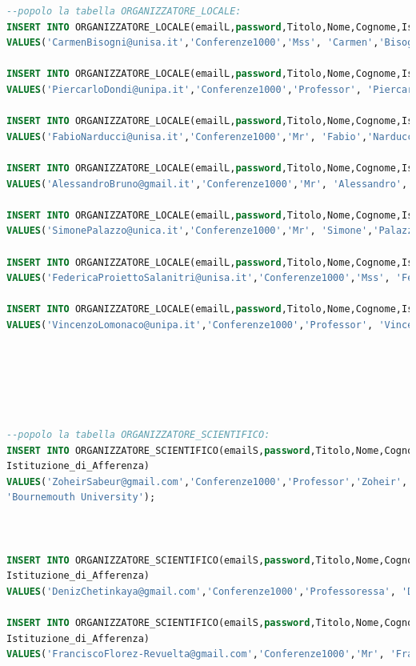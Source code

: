 \documentclass[a4page]{article}
\begin{document}
\begin{lstlisting}[language=SQL,
        deletekeywords={IDENTITY,INT},
        morekeywords={clustered},    
        framesep=10pt,
        framextopmargin=10pt]
--popolo la tabella ORGANIZZATORE_LOCALE:
INSERT INTO ORGANIZZATORE_LOCALE(emailL,password,Titolo,Nome,Cognome,Istituzione_di_Afferenza)
VALUES('CarmenBisogni@unisa.it','Conferenze1000','Mss', 'Carmen','Bisogni', 'Universita degli Studi di Salerno');

INSERT INTO ORGANIZZATORE_LOCALE(emailL,password,Titolo,Nome,Cognome,Istituzione_di_Afferenza)
VALUES('PiercarloDondi@unipa.it','Conferenze1000','Professor', 'Piercarlo','Dondi', 'Universita di Pavia');

INSERT INTO ORGANIZZATORE_LOCALE(emailL,password,Titolo,Nome,Cognome,Istituzione_di_Afferenza)
VALUES('FabioNarducci@unisa.it','Conferenze1000','Mr', 'Fabio','Narducci', 'Universita degli Studi di Salerno');

INSERT INTO ORGANIZZATORE_LOCALE(emailL,password,Titolo,Nome,Cognome,Istituzione_di_Afferenza)
VALUES('AlessandroBruno@gmail.it','Conferenze1000','Mr', 'Alessandro','Bruno', 'Humanitas University');

INSERT INTO ORGANIZZATORE_LOCALE(emailL,password,Titolo,Nome,Cognome,Istituzione_di_Afferenza)
VALUES('SimonePalazzo@unica.it','Conferenze1000','Mr', 'Simone','Palazzo', 'Universita di Catania');

INSERT INTO ORGANIZZATORE_LOCALE(emailL,password,Titolo,Nome,Cognome,Istituzione_di_Afferenza)
VALUES('FedericaProiettoSalanitri@unisa.it','Conferenze1000','Mss', 'Federica','Proietto Salanitri', 'Universita di Catania');

INSERT INTO ORGANIZZATORE_LOCALE(emailL,password,Titolo,Nome,Cognome,Istituzione_di_Afferenza)
VALUES('VincenzoLomonaco@unipa.it','Conferenze1000','Professor', 'Vincenzo','Lomonaco', 'Universita di Pavia');






--popolo la tabella ORGANIZZATORE_SCIENTIFICO:
INSERT INTO ORGANIZZATORE_SCIENTIFICO(emailS,password,Titolo,Nome,Cognome,
Istituzione_di_Afferenza)
VALUES('ZoheirSabeur@gmail.com','Conferenze1000','Professor','Zoheir','Sabeur',
'Bournemouth University');



INSERT INTO ORGANIZZATORE_SCIENTIFICO(emailS,password,Titolo,Nome,Cognome,
Istituzione_di_Afferenza)
VALUES('DenizChetinkaya@gmail.com','Conferenze1000','Professoressa', 'Deniz','Chetinkaya', 'Bournemouth University');

INSERT INTO ORGANIZZATORE_SCIENTIFICO(emailS,password,Titolo,Nome,Cognome,
Istituzione_di_Afferenza)
VALUES('FranciscoFlorez-Revuelta@gmail.com','Conferenze1000','Mr', 'Francisco','Florez-Revuelta', 'University of Alicante');


\end{lstlisting}
\end{document}
